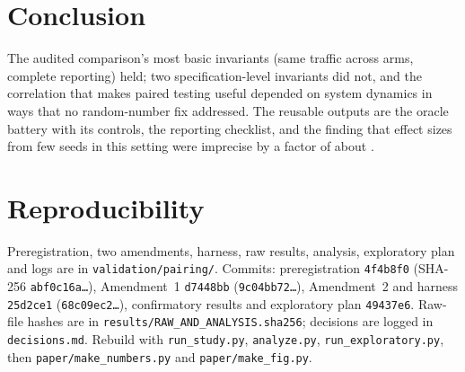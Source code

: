 \documentclass[11pt]{article}
\begin{document}
\section{Conclusion}
The audited comparison's most basic invariants (same traffic across arms, complete reporting) held; two specification-level invariants did not, and the correlation that makes paired testing useful depended on system dynamics in ways that no random-number fix addressed.
The reusable outputs are the oracle battery with its controls, the reporting checklist, and the finding that effect sizes from few seeds in this setting were imprecise by a factor of about \OldRatio{}.

\section*{Reproducibility}\label{sec:repro}
Preregistration, two amendments, harness, raw results, analysis, exploratory plan and logs are in \texttt{validation/pairing/}. Commits: preregistration \texttt{4f4b8f0} (SHA-256 \texttt{abf0c16a\dots}), Amendment~1 \texttt{d7448bb} (\texttt{9c04bb72\dots}), Amendment~2 and harness \texttt{25d2ce1} (\texttt{68c09ec2\dots}), confirmatory results and exploratory plan \texttt{49437e6}. Raw-file hashes are in \texttt{results/RAW\_AND\_ANALYSIS.sha256}; decisions are logged in \texttt{decisions.md}. Rebuild with \texttt{run\_study.py}, \texttt{analyze.py}, \texttt{run\_exploratory.py}, then \texttt{paper/make\_numbers.py} and \texttt{paper/make\_fig.py}.



\end{document}
